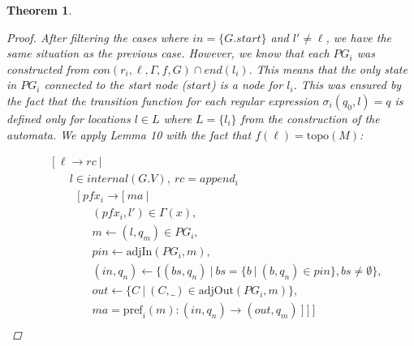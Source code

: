 \documentclass[twocolumn, openany]{sig-alternate-10pt}
\newcommand{\Pref}{\ensuremath{\mathrm{pref}}}
\newcommand{\Topo}{\ensuremath{\mathrm{topo}}}
\newtheorem{thm}{Theorem}
\begin{document}
\begin{thm}
\begin{proof}
  After filtering the cases where $in = \{ G.start \}$ and $l' \neq \ell$, we have the same situation as the previous case. 
  However, we know that each $PG_{i}$ was constructed from $con(r_{i}, \ell, \Gamma, f, G) \cap end(l_{i})$. This means that the only state in $PG_{i}$ connected to the start node ($\mathit{start}$) is a node for $l_{i}$. This was ensured by the fact that the transition function for each regular expression $\sigma_{i}(q_0,l) = q$ is defined only for locations $l \in L$ where $L = \{ l_{i} \}$ from the construction of the automata. We apply Lemma 10 with the fact that $f(\ell) = \Topo(M)$:

    \[ \begin{array}{l}
     ~~~~~ [~ \ell \rightarrow rc ~\vert~ \\
     ~~~~~~~~~~~~ l \in internal(G.V), ~rc = append_i \\
     ~~~~~~~~~~~~~~~ [~ pfx_i \rightarrow [~ ma ~\vert~ \\
     ~~~~~~~~~~~~~~~~~~~~~ (pfx_i, l') \in \Gamma(x), \\
     ~~~~~~~~~~~~~~~~~~~~~ m \leftarrow (l,q_m) \in PG_i, \\
     ~~~~~~~~~~~~~~~~~~~~~ pin \leftarrow \text{adjIn}(PG_i,m), \\
     ~~~~~~~~~~~~~~~~~~~~~ (in,q_n) \leftarrow \{ (bs,q_n) ~\vert~ bs=\{b ~\vert~ (b,q_n) \in pin \}, bs \neq \emptyset \}, \\
     ~~~~~~~~~~~~~~~~~~~~~ out \leftarrow \{ C ~\vert~ (C,\_) \in \text{adjOut}(PG_i,m) \}, \\
     ~~~~~~~~~~~~~~~~~~~~~ ma = \Pref_i(m) : (in,q_n) \rightarrow (out,q_m)  ~] ~] ~]\\
  \end{array} \]%



  \end{proof}

\end{thm}
\end{document}
